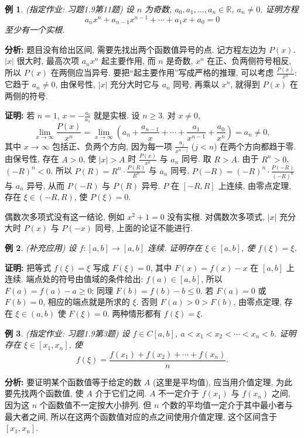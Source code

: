 \documentclass[UTF8,openany]{ctexbook}
\theoremstyle{chinesetextbook}
\newtheorem{example}{例}[section]
\newenvironment{cnproof}{\par\indent\textbf{证明:} \ignorespaces}{\par}
\begin{document}
\begin{example}
\textnormal{(指定作业: 习题1.9第11题)} 设 $n$ 为奇数, $a_0,a_1,\ldots,a_n\in\mathbb R$, $a_n\ne0$. 证明方程
\[
a_nx^n+a_{n-1}x^{n-1}+\cdots+a_1x+a_0=0
\]
至少有一个实根.
\end{example}
\par\indent\textbf{分析:} 题目没有给出区间, 需要先找出两个函数值异号的点. 记方程左边为 $P(x)$. $|x|$ 很大时, 最高次项 $a_nx^n$ 起主要作用, 而 $n$ 是奇数, $x^n$ 在正、负两侧符号相反, 所以 $P(x)$ 在两侧应当异号. 要把“起主要作用”写成严格的推理, 可以考虑 $\displaystyle\frac{P(x)}{x^n}$: 它趋于 $a_n\ne0$, 由保号性, $|x|$ 充分大时它与 $a_n$ 同号, 再乘以 $x^n$, 就得到 $P(x)$ 在两侧的符号.
\begin{cnproof}
若 $n=1$, $\displaystyle x=-\frac{a_0}{a_1}$ 就是实根. 设 $n\ge3$. 对 $x\ne0$,
\[
\lim_{x\to\infty}\frac{P(x)}{x^n}=\lim_{x\to\infty}\left(a_n+\frac{a_{n-1}}x+\cdots+\frac{a_1}{x^{n-1}}+\frac{a_0}{x^n}\right)=a_n\ne0,
\]
其中 $x\to\infty$ 包括正、负两个方向, 因为每一项 $\displaystyle\frac{a_j}{x^{n-j}}$ ($j<n$) 在两个方向都趋于零. 由保号性, 存在 $A>0$, 使 $|x|>A$ 时 $\displaystyle\frac{P(x)}{x^n}$ 与 $a_n$ 同号. 取 $R>A$. 由于 $R^n>0$, $(-R)^n<0$, 所以 $\displaystyle P(R)=R^n\cdot\frac{P(R)}{R^n}$ 与 $a_n$ 同号, $\displaystyle P(-R)=(-R)^n\cdot\frac{P(-R)}{(-R)^n}$ 与 $a_n$ 异号, 从而 $P(-R)$ 与 $P(R)$ 异号. $P$ 在 $[-R,R]$ 上连续, 由零点定理, 存在 $\xi\in(-R,R)$, 使 $P(\xi)=0$.
\end{cnproof}
偶数次多项式没有这一结论, 例如 $x^2+1=0$ 没有实根. 对偶数次多项式, $|x|$ 充分大时 $P(x)$ 与 $P(-x)$ 同号, 上面的论证不能进行.
\begin{example}
\textnormal{(补充应用)} 设 $f:[a,b]\to[a,b]$ 连续. 证明存在 $\xi\in[a,b]$, 使 $f(\xi)=\xi$.
\end{example}
\begin{cnproof}
把等式 $f(\xi)=\xi$ 写成 $F(\xi)=0$, 其中 $F(x)=f(x)-x$ 在 $[a,b]$ 上连续. 端点处的符号由值域的条件给出: $f(a)\in[a,b]$, 所以 $F(a)=f(a)-a\ge0$; 同理 $F(b)=f(b)-b\le0$. 若 $F(a)=0$ 或 $F(b)=0$, 相应的端点就是所求的 $\xi$. 否则 $F(a)>0>F(b)$, 由零点定理, 存在 $\xi\in(a,b)$ 使 $F(\xi)=0$. 两种情形都有 $f(\xi)=\xi$.
\end{cnproof}
\begin{example}
\textnormal{(指定作业: 习题1.9第3题)} 设 $f\in C[a,b]$, $a<x_1<x_2<\cdots<x_n<b$. 证明存在 $\xi\in[x_1,x_n]$, 使
\[
f(\xi)=\frac{f(x_1)+f(x_2)+\cdots+f(x_n)}n.
\]
\end{example}
\par\indent\textbf{分析:} 要证明某个函数值等于给定的数 $A$ (这里是平均值), 应当用介值定理, 为此要先找两个函数值, 使 $A$ 介于它们之间. $A$ 不一定介于 $f(x_1)$ 与 $f(x_n)$ 之间, 因为这 $n$ 个函数值不一定按大小排列. 但 $n$ 个数的平均值一定介于其中最小者与最大者之间, 所以在这两个函数值对应的点之间使用介值定理, 这个区间含于 $[x_1,x_n]$.
\end{document}
